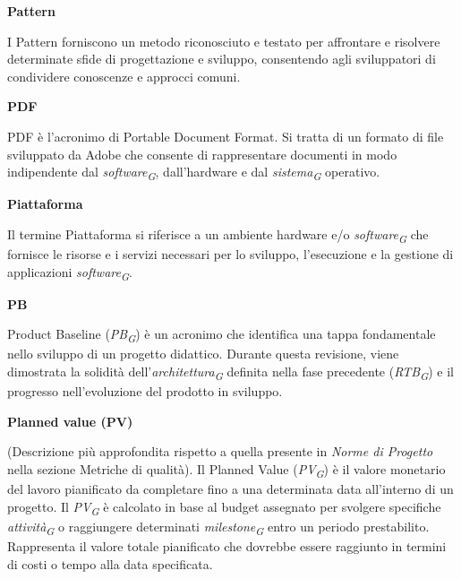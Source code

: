 \documentclass{article}
\begin{document}
\vspace{0.4cm}

\textbf{Pattern}

\vspace{0.1cm}

I Pattern forniscono un metodo riconosciuto e testato per affrontare e risolvere determinate sfide di progettazione e sviluppo, consentendo agli sviluppatori di condividere conoscenze e approcci comuni.

\vspace{0.4cm}

\textbf{PDF}

\vspace{0.1cm}

PDF è l'acronimo di Portable Document Format. Si tratta di un formato di file sviluppato da Adobe che consente di rappresentare documenti in modo indipendente dal \textit{software}\textsubscript{\textit{G}}, dall'hardware e dal \textit{sistema}\textsubscript{\textit{G}} operativo.

\vspace{0.4cm}

\textbf{Piattaforma}

\vspace{0.1cm}

Il termine Piattaforma si riferisce a un ambiente hardware e/o \textit{software}\textsubscript{\textit{G}} che fornisce le risorse e i servizi necessari per lo sviluppo, l'esecuzione e la gestione di applicazioni \textit{software}\textsubscript{\textit{G}}.

\vspace{0.4cm}

\textbf{PB}

\vspace{0.1cm}

Product Baseline (\textit{PB}\textsubscript{\textit{G}}) è un acronimo che identifica una tappa fondamentale nello sviluppo di un progetto didattico. Durante questa revisione, viene dimostrata la solidità dell'\textit{architettura}\textsubscript{\textit{G}} definita nella fase precedente (\textit{RTB}\textsubscript{\textit{G}}) e il progresso nell'evoluzione del prodotto in sviluppo.

\vspace{0.4cm}

\textbf{Planned value (PV)}

\vspace{0.1cm}

(Descrizione più approfondita rispetto a quella presente in \textit{Norme di Progetto} nella sezione Metriche di qualità). 
Il Planned Value (\textit{PV}\textsubscript{\textit{G}}) è il valore monetario del lavoro pianificato da completare fino a una determinata data all'interno di un progetto. Il \textit{PV}\textsubscript{\textit{G}} è calcolato in base al budget assegnato per svolgere specifiche \textit{attività}\textsubscript{\textit{G}} o raggiungere determinati \textit{milestone}\textsubscript{\textit{G}} entro un periodo prestabilito. Rappresenta il valore totale pianificato che dovrebbe essere raggiunto in termini di costi o tempo alla data specificata.
\end{document}
